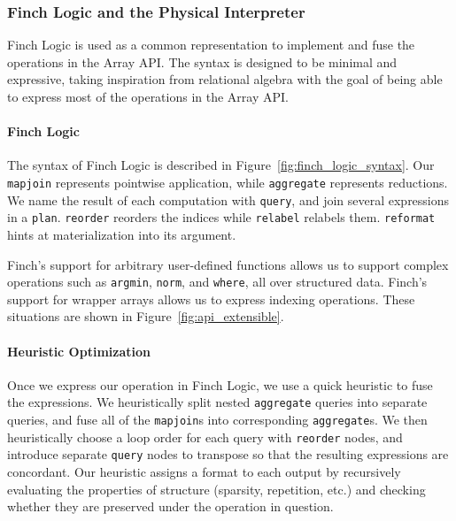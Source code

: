 \subsubsection{Finch Logic and the Physical Interpreter}
Finch Logic is used as a common representation to implement and fuse the operations in the Array API.
%
The syntax is designed to be minimal and expressive, taking inspiration from relational algebra with the goal of being able to express most of the operations in the Array API.

\paragraph{Finch Logic}
The syntax of Finch Logic is described in Figure~\ref{fig:finch_logic_syntax}.
%
Our \texttt{mapjoin} represents pointwise application, while \texttt{aggregate} represents reductions.
%
We name the result of each computation with \texttt{query}, and join several expressions in a \texttt{plan}.
%
\texttt{reorder} reorders the indices while \texttt{relabel} relabels them.
%
\texttt{reformat} hints at materialization into its argument.

Finch's support for arbitrary user-defined functions allows us to support complex operations such as \texttt{argmin}, \texttt{norm}, and \texttt{where}, all over structured data. Finch's support for wrapper arrays allows us to express indexing operations. These situations are shown in Figure~\ref{fig:api_extensible}.
\begin{figure}

\end{figure}

\paragraph{Heuristic Optimization}
Once we express our operation in Finch Logic, we use a quick heuristic to fuse the expressions. 
%
We heuristically split nested \texttt{aggregate} queries into separate queries, and fuse all of the \texttt{mapjoin}s into corresponding \texttt{aggregate}s.
%
We then heuristically choose a loop order for each query with \texttt{reorder} nodes, and introduce separate \texttt{query} nodes to transpose so that the resulting expressions are concordant.
%
Our heuristic assigns a format to each output by recursively evaluating the properties of structure (sparsity, repetition, etc.) and checking whether they are preserved under the operation in question.

